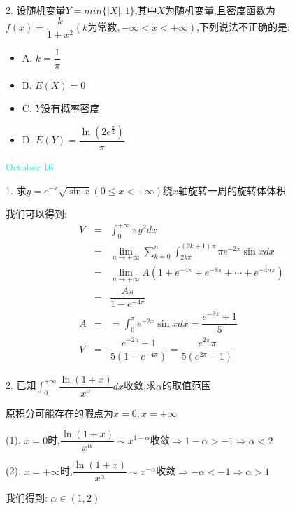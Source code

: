 2. 设随机变量$Y=min\{|X|,1\}$,其中$X$为随机变量,且密度函数为$f(x)=\dfrac{k}{1+x^2}(k\text{为常数},-\infty<x<+\infty)$,下列说法不正确的是:  
\begin{itemize}
	\item A. $k=\dfrac{1}{\pi}$
	\item B. $E(X)=0$
	\item C. $Y$没有概率密度
	\item D. $E(Y)=\dfrac{\ln(2e^{\frac{\pi}{2}})}{\pi}$
\end{itemize}

\begin{solution}
	
\end{solution}


\textcolor{cyan}{October 16}

1. 求$y=e^{-x}\sqrt{\sin x}(0\leq x<+\infty)$绕$x$轴旋转一周的旋转体体积

\begin{solution}

	我们可以得到:  
	\begin{eqnarray*}
		V&=&\int_{0}^{+\infty}\pi y^2dx\\
		&=&\lim\limits_{n\to+\infty}\sum\limits_{k=0}^{n}\int_{2k\pi}^{(2k+1)\pi}\pi e^{-2x}\sin xdx\\
		&=&\lim\limits_{n\to+\infty}A(1+e^{-4\pi}+e^{-8\pi}+\cdots+e^{-4n\pi})\\
		&=&\dfrac{A\pi}{1-e^{-4\pi}}\\
		A&=&=\int_{0}^{\pi}e^{-2x}\sin xdx=\dfrac{e^{-2\pi}+1}{5}\\
		V&=&\dfrac{e^{-2\pi}+1}{5(1-e^{-4\pi})}=\dfrac{e^{2\pi}\pi}{5(e^{2\pi}-1)}
	\end{eqnarray*}
\end{solution}


2. 已知$\int_{0}^{+\infty}\dfrac{\ln(1+x)}{x^{\alpha}}dx$收敛,求$\alpha$的取值范围


\begin{solution}

	原积分可能存在的暇点为$x=0,x=+\infty$
	
	(1). $x=0$时,$\dfrac{\ln(1+x)}{x^{\alpha}}\sim x^{1-\alpha}$收敛$\Rightarrow 1-\alpha>-1\Rightarrow \alpha<2$
	
	(2). $x=+\infty$时,$\dfrac{\ln(1+x)}{x^{\alpha}}\sim x^{-\alpha}$收敛$\Rightarrow -\alpha<-1\Rightarrow \alpha>1$
	
	我们得到:  $\alpha\in(1,2)$
\end{solution}


